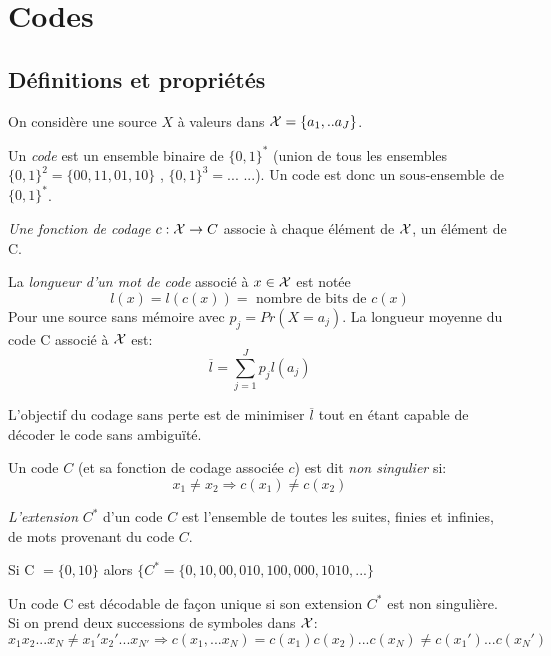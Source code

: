 \documentclass[main.tex]{subfiles}
\begin{document}
\section{Codes}

\subsection{Définitions et propriétés}
On considère une source $X$ à valeurs dans $\mathcal{X} = \{a_1,..a_J\}$.

\begin{defin}
Un \emph{code} est un ensemble binaire de $\{0,1\}^*$  (union de tous les ensembles $\{0,1\}^2 = \{00,11,01,10\}$ , $\{0,1\}^3 = ...$ ...). Un code est donc un sous-ensemble de $\{0,1\}^*$.\\
\end{defin}

\begin{defin}
\emph{Une fonction de codage} $c : \mathcal{X} \rightarrow C$ associe à chaque élément de $\mathcal{X}$, un élément de C.\\
\end{defin}

\begin{defin}
La \emph{longueur d'un mot de code} associé à $x \in \mathcal{X}$ est notée \[l(x) = l(c(x)) = \text{ nombre de bits de } c(x)\]
Pour une source sans mémoire avec $p_j = Pr(X=a_j)$. La longueur moyenne du code C associé à $\mathcal{X}$ est:
\[\overline{l} = \sum_{j=1}^J p_jl(a_j)\]
\end{defin}

L'objectif du codage sans perte est de minimiser $\overline{l}$ tout en étant capable de décoder le code sans ambiguïté.


\begin{defin}
Un code $C$ (et sa fonction de codage associée $c$) est dit \emph{non singulier} si:
\[x_1 \neq x_2 \Rightarrow c(x_1) \neq c(x_2) \]
\end{defin}

\begin{defin}
\emph{L'extension} $C^*$ d'un code $C$ est l'ensemble de toutes les suites, finies et infinies, de mots provenant du code $C$.
\end{defin}
\begin{exemple}
Si C $=\{0,10\}$ alors $\{C^*=\{0,10,00,010,100,000,1010,...\}$
\end{exemple}
\begin{prop}
Un code C est décodable de façon unique si son extension $C^*$ est non singulière.\\
Si on prend deux successions de symboles dans $\mathcal{X}$:
\[x_1x_2...x_N \neq x_1'x_2'...x_{N'} \Rightarrow c(x_1,...x_N)=c(x_1)c(x_2)...c(x_N) \neq c(x_1')...c(x_N')\]
\end{prop}
\end{document}
